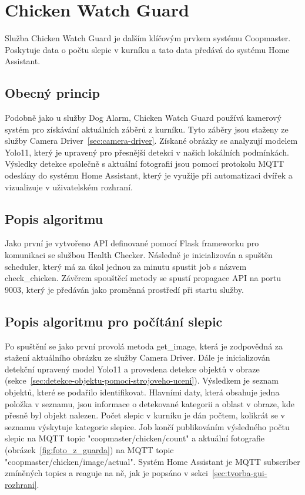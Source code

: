 \section{Chicken Watch Guard}\label{sec:chicken-watch-guard}
Služba Chicken Watch Guard je dalším klíčovým prvkem systému Coopmaster.
Poskytuje data o počtu slepic v kurníku a tato data předává do systému Home Assistant.\newline

\subsection*{Obecný princip}
Podobně jako u služby Dog Alarm, Chicken Watch Guard používá kamerový systém pro získávání aktuálních záběrů z kurníku.
Tyto záběry jsou staženy ze služby Camera Driver~\ref{sec:camera-driver}.
Získané obrázky se analyzují modelem Yolo11, který je upravený pro přesnější detekci v našich lokálních podmínkách.
Výsledky detekce společně s aktuální fotografií jsou pomocí protokolu MQTT~\cite{MQTT} odeslány do systému Home Assistant, který je využije při automatizaci dvířek a vizualizuje v uživatelském rozhraní.

\subsection*{Popis algoritmu}
Jako první je vytvořeno API definované pomocí Flask frameworku pro komunikaci se službou Health Checker.
Následně je inicializován a spuštěn scheduler, který má za úkol jednou za minutu spustit job s názvem check\_chicken.
Závěrem spouštěcí metody se spustí propagace API na portu 9003, který je předáván jako proměnná prostředí při startu služby.

\subsection*{Popis algoritmu pro počítání slepic}
Po spuštění se jako první provolá metoda get\_image, která je zodpovědná za stažení aktuálního obrázku ze služby Camera Driver.
Dále je inicializován detekční upravený model Yolo11 a provedena detekce objektů v obraze (sekce~\ref{sec:detekce-objektu-pomoci-strojoveho-uceni}).
Výsledkem je seznam objektů, které se podařilo identifikovat.
Hlavními daty, která obsahuje jedna položka v seznamu, jsou informace o detekované kategorii a oblast v obraze, kde přesně byl objekt nalezen.
Počet slepic v kurníku je dán počtem, kolikrát se v seznamu výskytuje kategorie slepice.
Job končí publikováním výsledného počtu slepic na MQTT topic "coopmaster/chicken/count"
 a aktuální fotografie (obrázek~\ref{fig:foto_z_guarda}) na MQTT topic "coopmaster/chicken/image/actual".
Systém Home Assistant je MQTT subscriber zmíněných topics a reaguje na ně, jak je popsáno v sekci~\ref{sec:tvorba-gui-rozhrani}.

